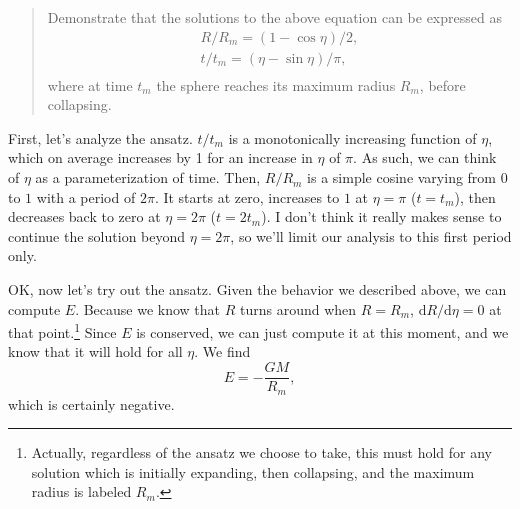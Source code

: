 \documentclass{article}
\renewcommand{\d}{\mathrm{d}}
\begin{document}
\begin{quote}
	Demonstrate that the solutions to the above equation can be expressed as
	\begin{equation}
		\begin{gathered}
			R / R_m = (1 - \cos\eta) / 2, \\
			t / t_m = (\eta - \sin\eta) / \pi, \\
		\end{gathered}
		\label{eq:ansatz}
	\end{equation}
	where at time $t_m$ the sphere reaches its maximum radius $R_m$, before
	collapsing.
\end{quote}

First, let's analyze the ansatz. $t/t_m$ is a monotonically increasing function
of $\eta$, which on average increases by 1 for an increase in $\eta$ of $\pi$.
As such, we can think of $\eta$ as a parameterization of time. Then, $R / R_m$
is a simple cosine varying from $0$ to $1$ with a period of $2 \pi$. It starts
at zero, increases to $1$ at $\eta = \pi$ ($t = t_m$), then decreases back to
zero at $\eta = 2\pi$ ($t = 2 t_m$). I don't think it really makes sense to
continue the solution beyond $\eta = 2\pi$, so we'll limit our analysis to this
first period only.

OK, now let's try out the ansatz. Given the behavior we described above, we can
compute $E$. Because we know that $R$ turns around when $R = R_m$, $\d R/\d\eta
= 0$ at that point.\footnote{%
Actually, regardless of the ansatz we choose to take, this must hold for any
solution which is initially expanding, then collapsing, and the maximum radius
is labeled $R_m$.} 
Since $E$ is conserved, we can just compute it at this moment, and we know that
it will hold for all $\eta$. We find
\begin{equation}
	E = - \frac{G M}{R_m},
\end{equation}
which is certainly negative.
\end{document}
